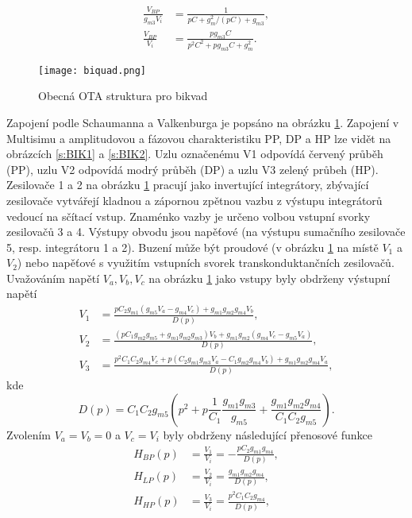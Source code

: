 \begin{align}
\frac{V_{BP}}{g_{m3}V_i} &= \frac{1}{pC + g_m^2/(pC) + g_{m3}},\\
\frac{V_{BP}}{V_i} &= \frac{pg_{m3}C}{p^2C^2 + pg_{m3}C + g_m^2}.
\end{align}
\begin{figure}[h]
\centering
\texttt{[image: biquad.png]}
\caption[Obecná OTA struktura pro bikvad]{Obecná OTA struktura pro bikvad \label{s:BIK}}
\end{figure}
\noindent Zapojení podle Schaumanna a Valkenburga \cite{13} je popsáno na obrázku \ref{s:BIK}. Zapojení v Multisimu a amplitudovou a fázovou charakteristiku PP, DP a HP lze vidět na obrázcích \ref{s:BIK1} a \ref{s:BIK2}. Uzlu označenému V1 odpovídá červený průběh (PP), uzlu V2 odpovídá modrý průběh (DP) a uzlu V3 zelený průbeh (HP). Zesilovače 1 a 2 na obrázku \ref{s:BIK} pracují jako invertující integrátory, zbývající zesilovače vytvářejí kladnou a zápornou zpětnou vazbu z výstupu integrátorů vedoucí na sčítací vstup. Znaménko vazby je určeno volbou vstupní svorky zesilovačů 3 a 4. Výstupy obvodu jsou napěťové (na výstupu sumačního zesilovače 5, resp. integrátoru 1 a 2). Buzení může být proudové (v obrázku \ref{s:BIK} na místě $V_1$ a $V_2$) nebo napěťové s využitím vstupních svorek transkonduktančních zesilovačů. Uvažováním napětí $V_a, V_b, V_c$ na obrázku \ref{s:BIK} jako vstupy byly obdrženy výstupní napětí
\begin{align}
V_1 &= \frac{pC_2g_{m1}(g_{m5}V_a - g_{m4}V_c) + g_{m1}g_{m2}g_{m4}V_b}{D(p)},\\
V_2 &= \frac{(pC_1g_{m2}g_{m5} + g_{m1}g_{m2}g_{m3})V_b + g_{m1}g_{m2}(g_{m4}V_c - g_{m5}V_a)}{D(p)},\\
V_3 &= \frac{p^2C_1C_2g_{m4}V_c + p(C_2g_{m1}g_{m3}V_a - C_1g_{m2}g_{m4}V_b) + g_{m1}g_{m2}g_{m4}V_a}{D(p)},
\end{align}\label{s:V3}
kde
\begin{equation}
D(p) = C_1C_2g_{m5}(p^2 + p\frac{1}{C_1}\frac{g_{m1}g_{m3}}{g_{m5}} + \frac{g_{m1}g_{m2}g_{m4}}{C_1C_2g_{m5}}).
\end{equation}\label{s:DS}
\noindent Zvolením $V_a = V_b = 0$ a $V_c = V_i$ byly obdrženy následující přenosové funkce
\begin{align}
H_{BP}(p) &= \frac{V_1}{V_i} = - \frac{pC_2g_{m1}g_{m4}}{D(p)},\\
H_{LP}(p) &= \frac{V_2}{V_i} = \frac{g_{m1}g_{m2}g_{m4}}{D(p)},\\
H_{HP}(p) &= \frac{V_3}{V_i} = \frac{p^2C_1C_2g_{m4}}{D(p)},
\end{align}
